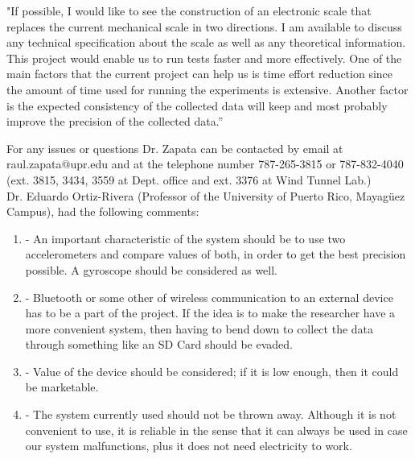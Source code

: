 	"If possible, I would like to see the construction of an electronic scale that replaces the current mechanical scale in two directions. I am available to discuss any technical specification about the scale as well as any theoretical information. This project would enable us to run tests faster and more effectively. One of the main factors that the current project can help us is time effort reduction since the amount of time used for running the experiments is extensive. Another factor is the expected consistency of the collected data will keep and most probably improve the precision of the collected data.”
 
 	For any issues or questions Dr. Zapata can be contacted by email at raul.zapata@upr.edu and at the telephone number 787-265-3815 or 787-832-4040 (ext. 3815, 3434, 3559 at Dept. office and ext. 3376 at Wind Tunnel Lab.) \\
	
	Dr. Eduardo Ortiz-Rivera (Professor of  the University of Puerto Rico, Mayagüez Campus), had the following comments:
	
	\begin{enumerate}
		\item -	An important characteristic of the system should be to use two accelerometers and compare values of both, in order to get the best precision possible. A gyroscope should be considered as well.
		\item - Bluetooth or some other of wireless communication to an external device has to be a part of the project. If the idea is to make the researcher have a more convenient system, then having to bend down to collect the data through something like an SD Card should be evaded.
		\item -	Value of the device should be considered; if it is low enough, then it could be marketable.
		\item - The system currently used should not be thrown away. Although it is not convenient to use, it is reliable in the sense that it can always be used in case our system malfunctions, plus it does not need electricity to work. 
	\end{enumerate}
	

